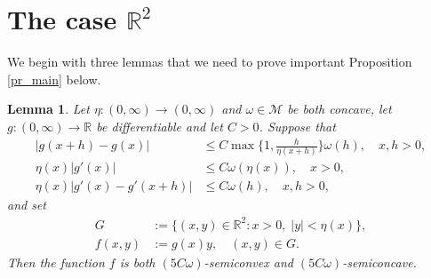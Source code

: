 \documentclass[10pt,a4paper]{amsart}
\newtheorem{lemma}[theorem]{Lemma}
\theoremstyle{definition}
\newcommand{\R}{\mathbb{R}}
\newcommand{\M}{\mathcal{M}}
\begin{document}
\section{The case $ \R^2 $}

We begin with three lemmas that we need to prove important Proposition \ref{pr_main} below.

\begin{lemma}\label{le_g1}
Let $ \eta:(0,\infty)\to (0,\infty) $ and $ \omega\in\M $ be both concave, let $ g:(0,\infty)\to\R $ be differentiable and let $ C>0 $. Suppose that
\begin{align}
\vert g(x+h)-g(x)\vert&\leq C\max\bigg\lbrace 1,\frac{h}{\eta(x+h)}\bigg\rbrace\omega(h),\quad x,h>0,\label{eq_g1_1}\\
\eta(x)\vert g'(x)\vert&\leq C\omega(\eta(x)),\quad x>0,\label{eq_g1_2}\\
\eta(x)\vert g'(x)-g'(x+h)\vert&\leq C\omega(h),\quad x,h>0,\label{eq_g1_3}
\end{align}
and set
\begin{align*}
G&:=\lbrace(x,y)\in\R^2:x>0,\;\vert y\vert<\eta(x)\rbrace,\\
f(x,y)&:=g(x)y,\quad (x,y)\in G.
\end{align*}
Then the function $ f $ is both $ (5C\omega) $-semiconvex and $ (5C\omega) $-semiconcave.
\end{lemma}
\end{document}
